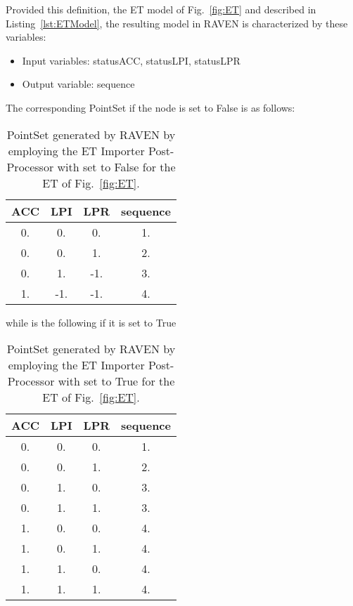 Provided this definition, the ET model of Fig.~\ref{fig:ET} and described in Listing~\ref{lst:ETModel}, 
the resulting model in RAVEN is characterized by these variables:
\begin{itemize}
	\item Input variables: statusACC, statusLPI, statusLPR
	\item Output variable: sequence
\end{itemize}
The corresponding PointSet if the  node is set to False is as follows:
\begin{table}
    \centering
    \caption{PointSet generated by RAVEN by employing the ET Importer Post-Processor with  
             set to False for the ET of Fig.~\ref{fig:ET}.}
	\begin{tabular}{c | c | c | c} 
		\hline 
		ACC & LPI & LPR & sequence \\ 
		\hline 
		0.  &  0. &  0. & 1. \\
		0.  &  0. &  1. & 2. \\
		0.  &  1. & -1. & 3. \\
		1.  & -1. & -1. & 4. \\
		\hline 
	\end{tabular}
\end{table}
while is the following if it is set to True
\begin{table}
    \centering
    \caption{PointSet generated by RAVEN by employing the ET Importer Post-Processor with  
             set to True for the ET of Fig.~\ref{fig:ET}.}
	\begin{tabular}{c | c | c | c} 
		\hline 
		ACC & LPI & LPR & sequence \\ 
		\hline 
		0.  &  0. &  0. & 1. \\
		0.  &  0. &  1. & 2. \\
		0.  &  1. &  0. & 3. \\
		0.  &  1. &  1. & 3. \\
		1.  &  0. &  0. & 4. \\
		1.  &  0. &  1. & 4. \\
		1.  &  1. &  0. & 4. \\
		1.  &  1. &  1. & 4. \\
		\hline 
	\end{tabular}
\end{table}

